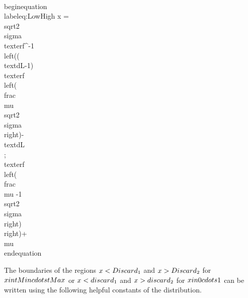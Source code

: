 \\begin{equation}\\label{eq:LowHigh}
 x = \\sqrt{2} \\sigma  \\text{erf}^{-1}\\left((\\text{dL}-1) \\text{erf}\\left(\\frac{\\mu }{\\sqrt{2} \\sigma }\\right)-\\text{dL} \\; \\text{erf}\\left(\\frac{\\mu -1}{\\sqrt{2} \\sigma }\\right)\\right)+\\mu
\\end{equation}


The boundaries of the regions $x < \\Discard_1 $ and $ x > \\Discard_2$ for $x \\in \\{\\tMin \\cdots \\tMax \\}$ or $x< \\discard_1$  and $ x > \\discard_2$ for $x \\in \\{0 \\cdots 1 \\}$ can be written using the following helpful constants of the distribution.

